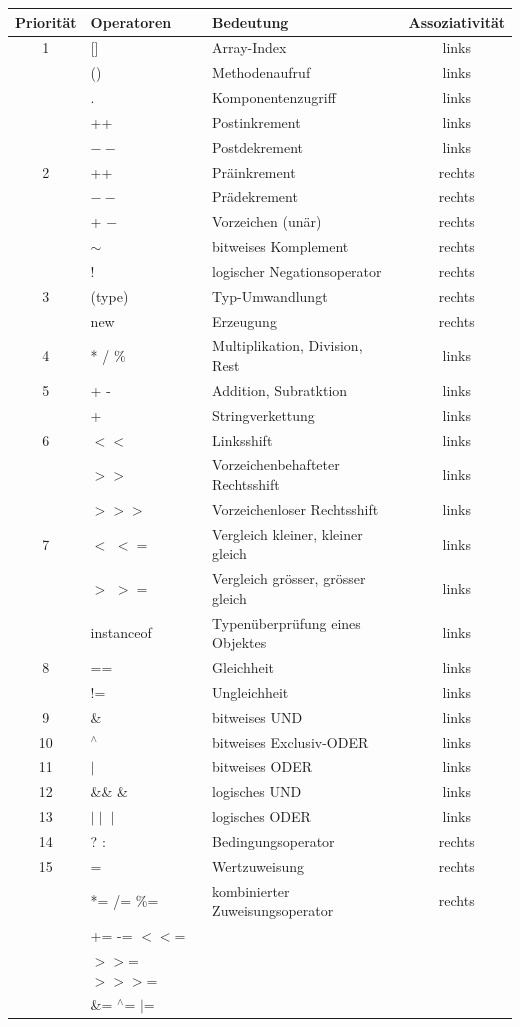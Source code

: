 \documentclass[a4paper,10pt]{article}
\newcommand{\Bold}[1]{\textbf{#1}} %
\begin{document}
\begin{center}
\begin{tabular}{|c|l|l|c|}
\hline
\Bold{Priorit\"at}&\Bold{Operatoren}&\Bold{Bedeutung}&\Bold{Assoziativit\"at}\\\hline\hline
1&[]&Array-Index&links\\
&()&Methodenaufruf&links\\
&.&Komponentenzugriff&links\\
&++&Postinkrement&links\\
&$--$&Postdekrement&links\\\hline
2&++&Pr\"ainkrement&rechts\\
&$--$&Pr\"adekrement&rechts\\
&+ $-$&Vorzeichen (un\"ar)&rechts\\
&$\sim$&bitweises Komplement&rechts\\
&!&logischer Negationsoperator&rechts\\\hline
3&(type)&Typ-Umwandlungt&rechts\\
&new&Erzeugung&rechts\\\hline
4&* { }/ { }\%&Multiplikation, Division, Rest&links\\\hline
5&+ -&Addition, Subratktion&links\\
&+&Stringverkettung&links\\\hline
6&$<<$&Linksshift&links\\
&$>>$&Vorzeichenbehafteter Rechtsshift&links\\
&$>>>$&Vorzeichenloser Rechtsshift&links\\\hline
7&$<$ $<=$&Vergleich kleiner, kleiner gleich&links\\
&$>$ $>=$&Vergleich gr\"osser, gr\"osser gleich&links\\
&instanceof&Typen\"uberpr\"ufung eines Objektes&links\\\hline
8&==&Gleichheit&links\\
&!=&Ungleichheit&links\\\hline
9&\& &bitweises UND&links\\\hline
10&$^\wedge$&bitweises Exclusiv-ODER&links\\\hline
11&$\mid$&bitweises ODER&links\\\hline
12&\&\& { } \& &logisches UND&links\\\hline
13&$\mid\mid$ { } $\mid$&logisches ODER&links\\\hline
14&? :&Bedingungsoperator&rechts\\\hline
15&=&Wertzuweisung&rechts\\\hline
&*= { }/= { }\%=&kombinierter Zuweisungsoperator&rechts\\
&+= { }-= { }$<<$=&&\\
&$>>$= { } $>>>$=&&\\
&\&= { }$^\wedge$= { }$\mid$=&&\\\hline

\end{tabular}
\end{center}
\end{document}

